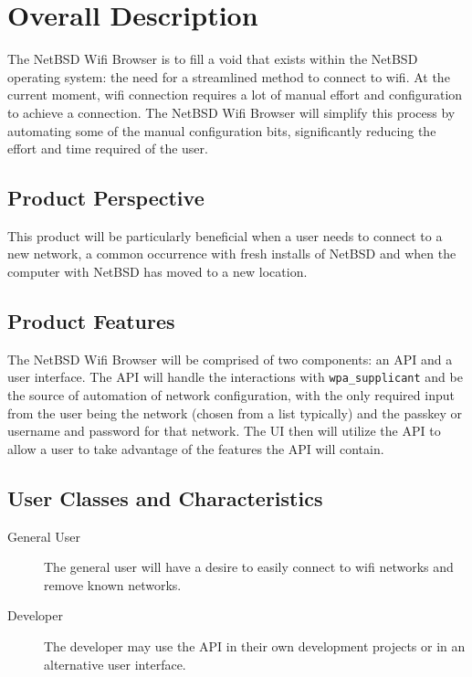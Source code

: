 \section{Overall Description}
%
The NetBSD Wifi Browser is to fill a void that exists within the NetBSD operating
system: the need for a streamlined method to connect to wifi. At the current
moment, wifi connection requires a lot of manual effort and configuration to
achieve a connection. The NetBSD Wifi Browser will simplify this process
by automating some of the manual configuration bits, significantly reducing the
effort and time required of the user.

\subsection{Product Perspective}
This product will be particularly beneficial when a user needs to connect to
a new network, a common occurrence with fresh installs of NetBSD and when the
computer with NetBSD has moved to a new location.

\subsection{Product Features}
The NetBSD Wifi Browser will be comprised of two components: an API and a
user interface. The API will handle the interactions with \texttt{wpa\_supplicant}
and be the source of automation of network configuration, with the only required
input from the user being the network (chosen from a list typically) and the
passkey or username and password for that network. The UI then will utilize the
API to allow a user to take advantage of the features the API will contain.

\subsection{User Classes and Characteristics}
\begin{description}
  \item[General User] The general user will have a desire to easily connect
    to wifi networks and remove known networks.
  \item[Developer] The developer may use the API in their own development projects
    or in an alternative user interface.
\end{description}

